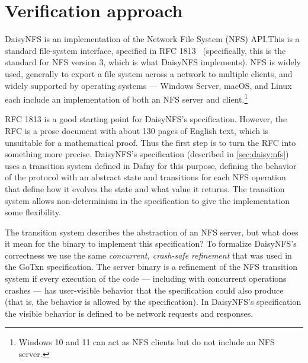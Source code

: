 \section{Verification approach}%
\label{sec:daisy:motivation}

DaisyNFS is an implementation of the Network File System (NFS) API.\@ This is a
standard file-system interface, specified in RFC 1813~\cite{RFC:1813}
(specifically, this is the standard for NFS version 3, which is what DaisyNFS
implements). NFS is widely used, generally to export a file system across a
network to multiple clients, and widely supported by operating systems ---
Windows Server, macOS, and Linux each include an implementation of both an NFS
server and client.\footnote{Windows 10 and 11 can act as NFS clients but do not
include an NFS server.}

RFC 1813 is a good starting point for DaisyNFS's specification.
However, the RFC is a prose document with about 130 pages of English text,
which is unsuitable for a mathematical proof. Thus the first step is
to turn the RFC into something more precise. DaisyNFS's specification (described in
\cref{sec:daisy:nfs}) uses a
transition system defined in Dafny for this purpose, defining the behavior of
the protocol with an abstract state and transitions for each NFS operation that define
how it evolves the state and what value it returns. The
transition system allows non-determinism in the specification to give the
implementation some flexibility.

The transition system describes the abstraction of an NFS server, but what does
it mean for the  binary to implement this specification? To formalize
DaisyNFS's correctness we use the same \emph{concurrent, crash-safe refinement}
that was used in the GoTxn
specification. The server binary is a refinement of the NFS transition
system if every execution of the code --- including with concurrent operations
crashes --- has
user-visible behavior that the specification could also produce (that is, the
behavior is allowed by the specification). In DaisyNFS's specification the visible
behavior is defined to be network requests and responses.

